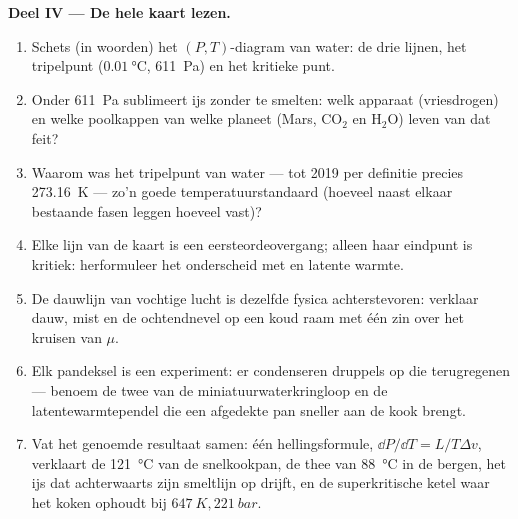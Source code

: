\begin{problem}
\medskip\noindent\textbf{Deel IV --- De hele kaart lezen.}
\begin{enumerate}[resume]
  \item Schets (in woorden) het $(P, T)$-diagram van water: de drie
        lijnen, het tripelpunt ($\qty{0.01}{\celsius}$,
        \qty{611}{Pa}) en het kritieke punt.
  \item Onder \qty{611}{Pa} sublimeert ijs zonder te smelten: welk
        apparaat (vriesdrogen) en welke poolkappen van welke planeet
        (Mars, CO$_2$ en H$_2$O) leven van dat feit?
  \item Waarom was het tripelpunt van water --- tot 2019 per definitie
        precies \qty{273.16}{K} --- zo'n goede
        temperatuurstandaard (hoeveel naast elkaar bestaande fasen leggen
        hoeveel  vast)?
  \item Elke lijn van de kaart is een eersteordeovergang; alleen
        haar eindpunt is kritiek: herformuleer het onderscheid met
         en latente warmte.
  \item De dauwlijn van vochtige lucht is dezelfde fysica achterstevoren:
        verklaar dauw, mist en de ochtendnevel op een koud raam
        met één zin over het kruisen van $\mu$.
  \item Elk pandeksel is een experiment: er condenseren druppels op
        die terugregenen --- benoem de twee  van de
        miniatuurwaterkringloop en de latentewarmtependel die
        een afgedekte pan sneller aan de kook brengt.
  \item Vat het genoemde resultaat samen: één hellingsformule, $\dd P/
        \dd T = L/T\Delta v$, verklaart de \qty{121}{\celsius} van de
        snelkookpan, de thee van \qty{88}{\celsius} in de bergen,
        het ijs dat achterwaarts zijn smeltlijn op drijft, en de
        superkritische ketel waar het koken ophoudt bij
        $\qty{647}{K}, \qty{221}{bar}$.
\end{enumerate}
\end{problem}

